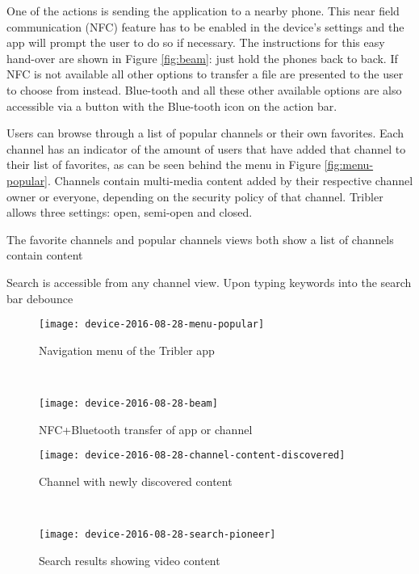 One of the actions is sending the application to a nearby phone.
This near field communication (NFC) feature has to be enabled in the device's settings and the app will prompt the user to do so if necessary.
The instructions for this easy hand-over are shown in Figure \ref{fig:beam}: just hold the phones back to back.
If NFC is not available all other options to transfer a file are presented to the user to choose from instead.
Blue-tooth and all these other available options are also accessible via a button with the Blue-tooth icon on the action bar.

Users can browse through a list of popular channels or their own favorites.
Each channel has an indicator of the amount of users that have added that channel to their list of favorites, as can be seen behind the menu in Figure \ref{fig:menu-popular}.
Channels contain multi-media content added by their respective channel owner or everyone, depending on the security policy of that channel.
Tribler allows three settings: open, semi-open and closed.


The favorite channels and popular channels views both show a list of channels  contain content

Search is accessible from any channel view.
Upon typing keywords into the search bar
debounce

\begin{figure}[p]
\centering
\begin{minipage}{.4\textwidth}
	\texttt{[image: device-2016-08-28-menu-popular]}
	\caption{Navigation menu of the Tribler app}
	\label{fig:menu-popular}
\end{minipage}
~
\begin{minipage}{.4\textwidth}
	\texttt{[image: device-2016-08-28-beam]}
	\caption{NFC+Bluetooth transfer of app or channel}
	\label{fig:beam}
\end{minipage}

\begin{minipage}{.4\textwidth}
	\texttt{[image: device-2016-08-28-channel-content-discovered]}
	\caption{Channel with newly discovered content}
	\label{fig:channel-content-discovered}
\end{minipage}
~
\begin{minipage}{.4\textwidth}
	\texttt{[image: device-2016-08-28-search-pioneer]}
	\caption{Search results showing video content}
	\label{fig:search-pioneer}
\end{minipage}
\end{figure}


